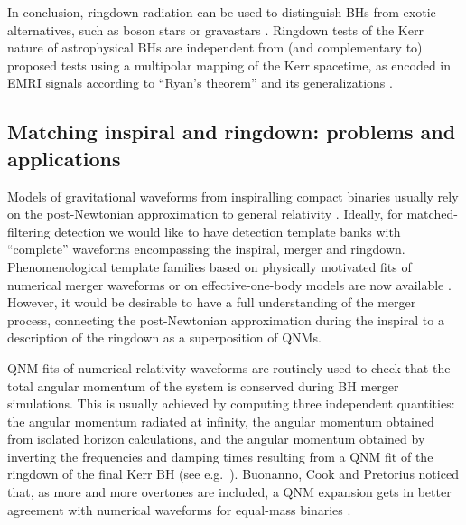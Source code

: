\documentclass[]{iopart}
\begin{document}
In conclusion, ringdown radiation can be used to distinguish BHs from exotic
alternatives, such as boson stars \cite{Berti:2006qt} or gravastars
\cite{Chirenti:2007mk}. Ringdown tests of the Kerr nature of astrophysical BHs
are independent from (and complementary to) proposed tests using a multipolar
mapping of the Kerr spacetime, as encoded in EMRI signals according to
``Ryan's theorem'' and its generalizations
\cite{Ryan:1995wh,Ryan:1997hg,Li:2007qu}.

\subsection{\label{insptrans}Matching inspiral and ringdown: problems and applications}

Models of gravitational waveforms from inspiralling compact binaries usually
rely on the post-Newtonian approximation to general relativity
\cite{Blanchet:2002av}. Ideally, for matched-filtering detection we would like
to have detection template banks with ``complete'' waveforms encompassing the
inspiral, merger and ringdown. Phenomenological template families based on
physically motivated fits of numerical merger waveforms or on
effective-one-body models are now available
\cite{Ajith:2007qp,Ajith:2007kx,Pan:2007nw,Boyle:2009dg}. However, it would be
desirable to have a full understanding of the merger process, connecting the
post-Newtonian approximation during the inspiral to a description of the
ringdown as a superposition of QNMs.

QNM fits of numerical relativity waveforms are routinely used to check that
the total angular momentum of the system is conserved during BH merger
simulations. This is usually achieved by computing three independent
quantities: the angular momentum radiated at infinity, the angular momentum
obtained from isolated horizon calculations, and the angular momentum obtained
by inverting the frequencies and damping times resulting from a QNM fit of the
ringdown of the final Kerr BH (see
e.g.~\cite{Buonanno:2006ui,Berti:2007fi,Dain:2008ck}).  Buonanno, Cook and
Pretorius noticed that, as more and more overtones are included, a QNM
expansion gets in better agreement with numerical waveforms for equal-mass
binaries \cite{Buonanno:2006ui}. 
\end{document}
